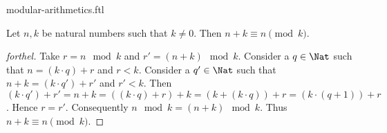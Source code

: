 \documentclass{naproche-library}
\begin{document}
\begin{smodule}{modular-arithmetics.ftl}
  \begin{proposition}[forthel,id=ARITHMETIC_08_5984712287846400,printid]
    Let $n, k$ be natural numbers such that $k \neq 0$.
    Then $n + k \equiv n \pmod{k}$.
  \end{proposition}
  \begin{proof}[forthel]
    Take $r = n \mod k$ and $r' = (n + k) \mod k$.
    Consider a $q \in \Nat$ such that $n = (k \cdot q) + r$ and $r < k$.
    Consider a $q' \in \Nat$ such that $n + k = (k \cdot q') + r'$ and
    $r' < k$.
    Then $(k \cdot q') + r'
      = n + k
      = ((k \cdot q) + r) + k
      = (k + (k \cdot q)) + r
      = (k \cdot (q + 1)) + r$.
    Hence $r = r'$.
    Consequently $n \mod k = (n + k) \mod k$.
    Thus $n + k \equiv n \pmod{k}$.
  \end{proof}
\end{smodule}
\end{document}
